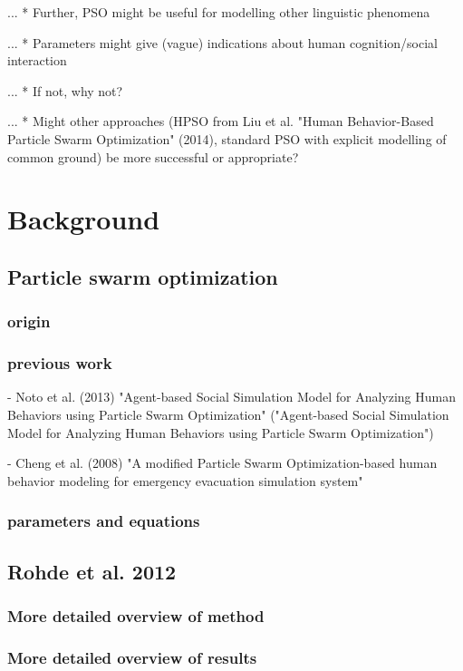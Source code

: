 \documentclass[12pt]{article}
\begin{document}
... * Further, PSO might be useful for modelling other linguistic phenomena

... * Parameters might give (vague) indications about human cognition/social interaction

... * If not, why not?

... * Might other approaches (HPSO from Liu et al. "Human Behavior-Based Particle Swarm Optimization" (2014), standard PSO with explicit modelling of common ground) be more successful or appropriate?



\section{Background}
\subsection{Particle swarm optimization}
\subsubsection{origin}
\subsubsection{previous work}
- Noto et al. (2013) "Agent-based Social Simulation Model for Analyzing Human Behaviors using Particle Swarm Optimization" ("Agent-based Social Simulation Model for Analyzing Human Behaviors using Particle Swarm Optimization")

- Cheng et al. (2008) "A modified Particle Swarm Optimization-based human behavior modeling for emergency evacuation simulation system"
\subsubsection{parameters and equations}

\subsection{Rohde et al. 2012}
\subsubsection{More detailed overview of method}
\subsubsection{More detailed overview of results}
\end{document}
